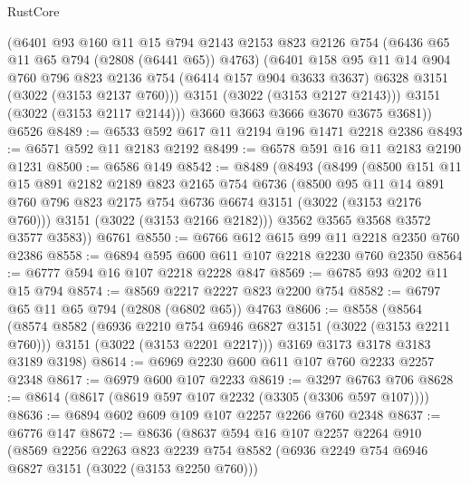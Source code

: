 \begin{lexlean}{RustCore}
\begin{coremodule}
          (@6401
            @93
            @160
            @11
            @15
            @794
            @2143
            @2153
            @823
            @2126
            @754
            (@6436 @65 @11 @65 @794 (@2808 (@6441 @65)) @4763)
            (@6401
              @158
              @95
              @11
              @14
              @904
              @760
              @796
              @823
              @2136
              @754
              (@6414 @157 @904 @3633 @3637)
              @6328
              @3151
              (@3022 (@3153 @2137 @760)))
            @3151
            (@3022 (@3153 @2127 @2143)))
          @3151
          (@3022 (@3153 @2117 @2144)))
        @3660
        @3663
        @3666
        @3670
        @3675
        @3681))
    @6526
@8489 := @6533 @592 @617 @11 @2194 @196 @1471 @2218 @2386
@8493 := @6571 @592 @11 @2183 @2192
@8499 := @6578 @591 @16 @11 @2183 @2190 @1231
@8500 := @6586 @149
@8542 := @8489
    (@8493
      (@8499
        (@8500
          @151
          @11
          @15
          @891
          @2182
          @2189
          @823
          @2165
          @754
          @6736
          (@8500
            @95
            @11
            @14
            @891
            @760
            @796
            @823
            @2175
            @754
            @6736
            @6674
            @3151
            (@3022 (@3153 @2176 @760)))
          @3151
          (@3022 (@3153 @2166 @2182)))
        @3562
        @3565
        @3568
        @3572
        @3577
        @3583))
    @6761
@8550 := @6766 @612 @615 @99 @11 @2218 @2350 @760 @2386
@8558 := @6894 @595 @600 @611 @107 @2218 @2230 @760 @2350
@8564 := @6777 @594 @16 @107 @2218 @2228 @847
@8569 := @6785 @93 @202 @11 @15 @794
@8574 := @8569 @2217 @2227 @823 @2200 @754
@8582 := @6797 @65 @11 @65 @794 (@2808 (@6802 @65)) @4763
@8606 := @8558
    (@8564
      (@8574
        @8582
        (@6936 @2210 @754 @6946 @6827 @3151 (@3022 (@3153 @2211 @760)))
        @3151
        (@3022 (@3153 @2201 @2217)))
      @3169
      @3173
      @3178
      @3183
      @3189
      @3198)
@8614 := @6969 @2230 @600 @611 @107 @760 @2233 @2257 @2348
@8617 := @6979 @600 @107 @2233
@8619 := @3297 @6763 @706
@8628 := @8614 (@8617 (@8619 @597 @107 @2232 (@3305 (@3306 @597 @107))))
@8636 := @6894 @602 @609 @109 @107 @2257 @2266 @760 @2348
@8637 := @6776 @147
@8672 := @8636
    (@8637
      @594
      @16
      @107
      @2257
      @2264
      @910
      (@8569
        @2256
        @2263
        @823
        @2239
        @754
        @8582
        (@6936 @2249 @754 @6946 @6827 @3151 (@3022 (@3153 @2250 @760)))

\end{coremodule}
\end{lexlean}
